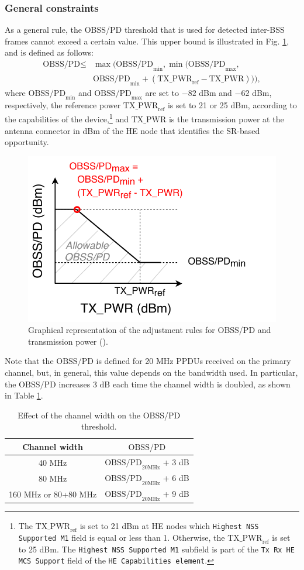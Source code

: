 \documentclass[preprint,12pt]{elsarticle}
\begin{document}
	\subsubsection{General constraints}
	As a general rule, the OBSS/PD threshold that is used for detected inter-BSS frames cannot exceed a certain value. This upper bound is illustrated in Fig. \ref{fig:fig_7}, and is defined as follows:
	\begin{align}\nonumber \text{OBSS/PD} \leq & \max\Big(\text{OBSS/PD}_{\min}, \min\big(\text{OBSS/PD}_{\max},\\ & \text{OBSS/PD}_{\min} + (\text{TX\_PWR}_{\text{ref}}-\text{TX\_PWR})\big)\Big), \nonumber \end{align}
	where $\text{OBSS/PD}_{\min}$ and $\text{OBSS/PD}_{\max}$ are set to $-82$ dBm and $-62$ dBm, respectively, the reference power $\text{TX\_PWR}_{\text{ref}}$ is set to 21 or 25 dBm, according to the
	capabilities of the device,\footnote{The $\text{TX\_PWR}_{\text{ref}}$ is set to 21 dBm at HE nodes which \texttt{Highest NSS Supported M1} field is equal or less than 1. Otherwise, the  $\text{TX\_PWR}_{\text{ref}}$ is set to 25 dBm. The \texttt{Highest NSS Supported M1} subfield is part of the \texttt{Tx Rx HE MCS Support} field of the \texttt{HE Capabilities element}.} and $\text{TX\_PWR}$ is the transmission power at the antenna connector in dBm of the HE node that identifies the SR-based opportunity.
	\begin{figure}[ht!]
		\centering
		\includegraphics[width=0.4\columnwidth]{fig_10}
		\caption{Graphical representation of the adjustment rules for OBSS/PD and transmission power (\citealp{tgax2019draft}).}
		\label{fig:fig_7}
	\end{figure}
	
	Note that the $\text{OBSS/PD}$ is defined for 20 MHz PPDUs received on the primary channel, but, in general, this value depends on the bandwidth used. In particular, the $\text{OBSS/PD}$ increases 3 dB each time the channel width is doubled, as shown in Table \ref{tbl:sensitivity_channel_width}.
	\begin{table}[ht!]
		\centering
		\begin{tabular}{|c|l|}
				\hline
				\textbf{Channel width} & \multicolumn{1}{c|}{\textbf{$\text{OBSS/PD}$}} \\ \hline
				40 MHz & $\text{OBSS/PD}_{20 \text{MHz}}$ + 3 dB \\ \hline
				80 MHz & $\text{OBSS/PD}_{20 \text{MHz}}$ + 6 dB \\ \hline
				160 MHz or 80+80 MHz   & $\text{OBSS/PD}_{20 \text{MHz}}$ + 9 dB \\ \hline
		\end{tabular}
		\caption{Effect of the channel width on the OBSS/PD threshold.}
		\label{tbl:sensitivity_channel_width}
	\end{table}	
	
\end{document}
